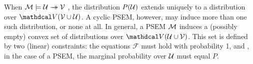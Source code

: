 %
{%
    When $\mathcal M \models \mathcal U \rightarrow\mathrel{\mspace{-15mu}}\rightarrow \mathcal V$ 
    ,
    the distribution
    $P(\mathcal U)$
    extends uniquely to a distribution over $\V(\enV \cup \U)$.    
}%
A cyclic PSEM, however, may induce more than one such distribution, or none at all.
In general, a PSEM $\cal M$
induces a (possibly empty) convex set of distributions over $\V(\U \cup \enV)$.
This set is defined by two (linear) constraints:
the equations $\mathcal F$ must hold with probability 1, and
\unskip, in the case of a PSEM,
the marginal probability over $\mathcal U$ must equal $P$. 
